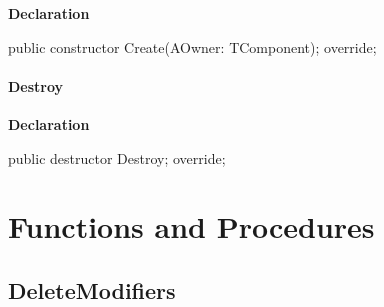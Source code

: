 \documentclass{report}
\newif\ifpdf
\begin{document}
\label{utilities.TListEntry-Create}
\begin{list}{}{
\setlength{\itemindent}{0cm}
\setlength{\listparindent}{0cm}
\setlength{\leftmargin}{\evensidemargin}
\addtolength{\leftmargin}{\tmplength}
\settowidth{\labelsep}{X}
\addtolength{\leftmargin}{\labelsep}
\setlength{\labelwidth}{\tmplength}
}
\item[\textbf{Declaration}\hfill]
\ifpdf
\begin{flushleft}
\fi
\begin{ttfamily}
public constructor Create(AOwner: TComponent); override;\end{ttfamily}

\ifpdf
\end{flushleft}
\fi

\end{list}
\paragraph*{Destroy}\hspace*{\fill}

\label{utilities.TListEntry-Destroy}
\begin{list}{}{
\setlength{\itemindent}{0cm}
\setlength{\listparindent}{0cm}
\setlength{\leftmargin}{\evensidemargin}
\addtolength{\leftmargin}{\tmplength}
\settowidth{\labelsep}{X}
\addtolength{\leftmargin}{\labelsep}
\setlength{\labelwidth}{\tmplength}
}
\item[\textbf{Declaration}\hfill]
\ifpdf
\begin{flushleft}
\fi
\begin{ttfamily}
public destructor Destroy; override;\end{ttfamily}

\ifpdf
\end{flushleft}
\fi

\end{list}
\section{Functions and Procedures}
\ifpdf
\subsection*{\large{\textbf{DeleteModifiers}}\normalsize\hspace{1ex}\hrulefill}
\else
\end{document}
